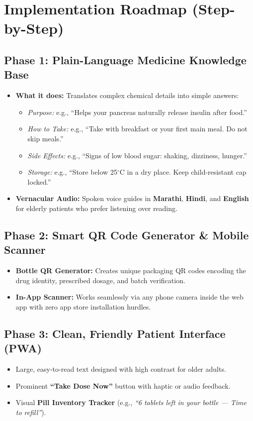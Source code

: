 \documentclass[11pt,a4paper]{article}
\begin{document}
\newpage

\section{Implementation Roadmap (Step-by-Step)}

\subsection{Phase 1: Plain-Language Medicine Knowledge Base}
\begin{itemize}[leftmargin=*,itemsep=2pt]
    \item \textbf{What it does:} Translates complex chemical details into simple answers:
    \begin{itemize}
        \item \textit{Purpose:} e.g., ``Helps your pancreas naturally release insulin after food.''
        \item \textit{How to Take:} e.g., ``Take with breakfast or your first main meal. Do not skip meals.''
        \item \textit{Side Effects:} e.g., ``Signs of low blood sugar: shaking, dizziness, hunger.''
        \item \textit{Storage:} e.g., ``Store below 25$^\circ$C in a dry place. Keep child-resistant cap locked.''
    \end{itemize}
    \item \textbf{Vernacular Audio:} Spoken voice guides in \textbf{Marathi}, \textbf{Hindi}, and \textbf{English} for elderly patients who prefer listening over reading.
\end{itemize}

\subsection{Phase 2: Smart QR Code Generator \& Mobile Scanner}
\begin{itemize}[leftmargin=*,itemsep=2pt]
    \item \textbf{Bottle QR Generator:} Creates unique packaging QR codes encoding the drug identity, prescribed dosage, and batch verification.
    \item \textbf{In-App Scanner:} Works seamlessly via any phone camera inside the web app with zero app store installation hurdles.
\end{itemize}

\subsection{Phase 3: Clean, Friendly Patient Interface (PWA)}
\begin{itemize}[leftmargin=*,itemsep=2pt]
    \item Large, easy-to-read text designed with high contrast for older adults.
    \item Prominent \textbf{``Take Dose Now''} button with haptic or audio feedback.
    \item Visual \textbf{Pill Inventory Tracker} (e.g., \textit{``6 tablets left in your bottle — Time to refill''}).
\end{itemize}
\end{document}
